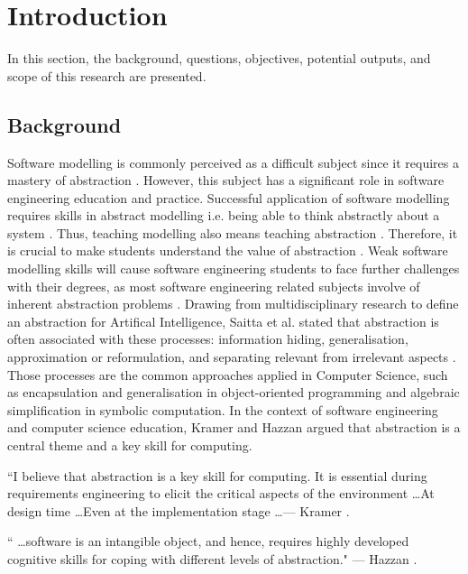 \documentclass[12pt, a4paper]{report} \usepackage[titletoc]{appendix}
\begin{document}
\chapter{Introduction}
\label{Introduction}
In this section, the background, questions, objectives, potential outputs, and scope of this research are presented.

\section{Background}
Software modelling is commonly perceived as a difficult subject since it
requires a mastery of abstraction \cite{Borstler2012}. However, this subject has a significant role in software engineering education and
practice. Successful application of software modelling requires skills in
abstract modelling \cite{whittle2013industrial}i.e. being able to think abstractly about a system \cite{bezivin2009teaching}. Thus, teaching modelling also means teaching abstraction \cite{engels2005teaching}. Therefore, it is crucial to make students understand the value of abstraction \cite{bezivin2009teaching}. Weak software modelling skills will cause software engineering students to face further challenges with their degrees, as most software engineering related subjects involve of inherent abstraction problems \cite{Kramer2007}. Drawing from multidisciplinary research to define an abstraction for Artifical Intelligence, Saitta et al. stated that abstraction is often associated with these processes: information hiding, generalisation, approximation or reformulation, and separating relevant from irrelevant aspects \cite{Saitta2013}. Those processes are the common approaches applied in Computer Science, such as encapsulation and generalisation in object-oriented programming and algebraic simplification in symbolic computation. In the context of software engineering and computer science education, Kramer \cite{Kramer2007} and Hazzan \cite{hazzan2008reflections} argued that abstraction is a central theme and a key skill for computing.

\begin{displayquote}
``I believe that abstraction is a key skill for computing. It is essential
during requirements engineering to elicit the critical aspects of the 
environment \dots At design time \dots Even at the implementation stage
\dots --- Kramer \cite{Kramer2007}.
\end{displayquote}

\begin{displayquote}
`` \dots software is an intangible object, and hence, requires highly developed
cognitive skills for coping with different levels of abstraction." --- Hazzan
\cite{hazzan2008reflections}.
\end{displayquote}
\end{document}
